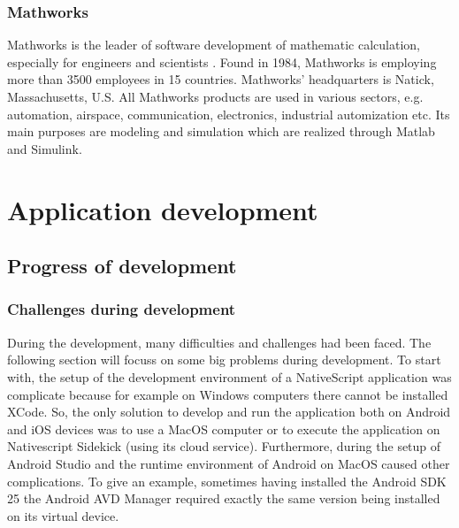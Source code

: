 \subsubsection{Mathworks}

Mathworks is the leader of software development of mathematic calculation, especially for engineers and scientists \cite{mathworks}. Found in 1984, Mathworks is employing more than 3500 employees in 15 countries. Mathworks' headquarters is Natick, Massachusetts, U.S. All Mathworks products are used in various sectors, e.g. automation, airspace, communication, electronics, industrial automization etc. Its main purposes are modeling and simulation which are realized through Matlab and Simulink.

\section{Application development} \label{app_development}

\subsection{Progress of development}

\subsubsection{Challenges during development} \label{challenge}

During the development, many difficulties and challenges had been faced. The following section will focuss on some big problems during development.
To start with, the setup of the development environment of a NativeScript application was complicate because for example on Windows computers there cannot be installed XCode. So, the only solution to develop and run the application both on Android and iOS devices was to use a MacOS computer or to execute the application on Nativescript Sidekick (using its cloud service). Furthermore, during the setup of Android Studio and the runtime environment of Android on MacOS caused other complications. To give an example, sometimes having installed the Android \ac{SDK} 25 the Android \ac{AVD} Manager required exactly the same version being installed on its virtual device. 

